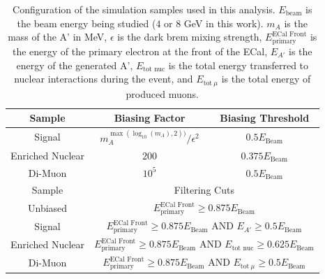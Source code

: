 \begin{table}
  \centering
  \begin{tabular}{|c|c|c|}
      \hline
      Sample & Biasing Factor & Biasing Threshold
      \\ \hline
      Signal & $m_A^{\max(\log_{10}(m_A),2))}/\epsilon^2$ & $0.5E_\text{Beam}$
      \\
      Enriched Nuclear & $200$ & $0.375E_\text{Beam}$
      \\
      Di-Muon & $10^5$ & $0.5E_\text{Beam}$
      \\
      \hline \hline
      Sample & \multicolumn{2}{c|}{Filtering Cuts}
      \\ \hline
      Unbiased  
          & \multicolumn{2}{c|}{$E_{\text{primary}}^{\text{ECal Front}} \geq 0.875E_\text{Beam}$}
      \\
      Signal 
          & \multicolumn{2}{c|}{$E_{\text{primary}}^{\text{ECal Front}} \geq 0.875E_\text{Beam}$ AND $E_{A'}\geq 0.5E_\text{Beam}$}
      \\
      Enriched Nuclear
          & \multicolumn{2}{c|}{$E_{\text{primary}}^{\text{ECal Front}} \geq 0.875E_\text{Beam}$ AND $E_{\text{tot nuc}}\geq 0.625E_\text{Beam}$}
      \\
      Di-Muon
          & \multicolumn{2}{c|}{$E_{\text{primary}}^{\text{ECal Front}} \geq 0.875E_\text{Beam}$ AND $E_{\text{tot}~\mu}\geq 0.5E_\text{Beam}$}
      \\ \hline
  \end{tabular}
  \caption{Configuration of the simulation samples used in this analysis.
  $E_\mathrm{beam}$ is the beam energy being studied ($4$ or $8$ GeV in this work).
  $m_A$ is the mass of the A' in MeV, $\epsilon$ is the dark brem mixing strength,
  $E_{\text{primary}}^{\text{ECal Front}}$ is the energy of the primary electron at the
  front of the ECal, $E_{A'}$ is the energy of the generated A',
  $E_{\text{tot nuc}}$ is the total energy transferred to nuclear interactions during the event,
  and $E_{\text{tot}~\mu}$ is the total energy of produced muons.}
  \label{tab:sample-summary}
\end{table}
